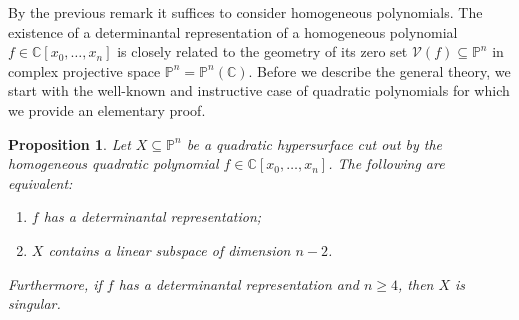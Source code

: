 \documentclass[a4paper,10pt]{amsart}
\theoremstyle{definition}
\theoremstyle{plain}
\newtheorem{prop}[Def]{Proposition}
\newcommand{\cV}{{\mathcal V}}
\newcommand{\C}{{\mathbb C}}
\newcommand{\pp}{\mathbb{P}}
\begin{document}
By the previous remark it suffices to consider homogeneous polynomials.
The existence of a determinantal representation of a homogeneous polynomial $f\in\C[x_0,\ldots,x_n]$ is closely related to the geometry of its zero set $\cV(f)\subseteq\pp^n$ in complex projective space $\pp^n=\pp^n(\C)$. Before we describe the general theory, we start with the well-known and instructive case of quadratic polynomials for which we provide an elementary proof.

\begin{prop}\label{prop:quadratic}
    Let $X\subseteq\pp^n$ be a quadratic hypersurface cut out by the homogeneous quadratic polynomial $f\in\C[x_0,\ldots,x_n]$. The following are equivalent:
    \begin{enumerate}
        \item $f$ has a determinantal representation;
        \item $X$ contains a linear subspace of dimension $n-2$. 
    \end{enumerate}
    Furthermore, if $f$ has a determinantal representation and $n\geq4$, then $X$ is singular.
\end{prop}
\end{document}
